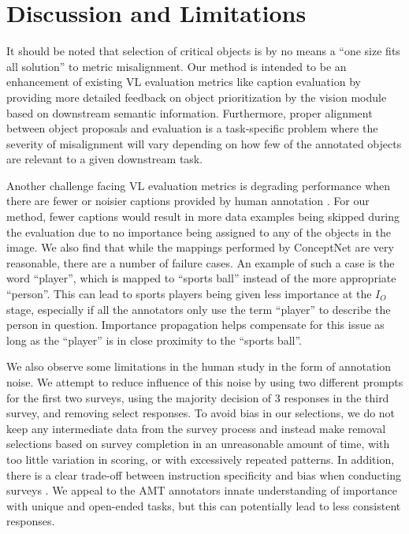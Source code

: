 \documentclass[10pt,twocolumn,letterpaper]{article}
\begin{document}
\section{Discussion and Limitations} 
It should be noted that selection of critical objects is by no means a ``one size fits all solution'' to metric misalignment. Our method is intended to be an enhancement of existing VL evaluation metrics like caption evaluation by providing more detailed feedback on object prioritization by the vision module based on downstream semantic information. Furthermore, proper alignment between object proposals and evaluation is a task-specific problem where the severity of misalignment will vary depending on how few of the annotated objects are relevant to a given downstream task. 
\par
Another challenge facing VL evaluation metrics is degrading performance when there are fewer or noisier captions provided by human annotation \cite{spice2016}. For our method, fewer captions would result in more data examples being skipped during the evaluation due to no importance being assigned to any of the objects in the image. We also find that while the mappings performed by ConceptNet are very reasonable, there are a number of failure cases. An example of such a case is the word ``player'', which is mapped to ``sports ball'' instead of the more appropriate ``person''. This can lead to sports players being given less importance at the $I_{O}$ stage, especially if all the annotators only use the term ``player'' to describe the person in question. Importance propagation helps compensate for this issue as long as the ``player'' is in close proximity to the ``sports ball''.
\par
We also observe some limitations in the human study in the form of annotation noise. We attempt to reduce influence of this noise by using two different prompts for the first two surveys, using the majority decision of 3 responses in the third survey, and removing select responses. To avoid bias in our selections, we do not keep any intermediate data from the survey process and instead make removal selections based on survey completion in an unreasonable amount of time, with too little variation in scoring, or with excessively repeated patterns. In addition, there is a clear trade-off between instruction specificity and bias when conducting surveys \cite{blame2022}. We appeal to the AMT annotators innate understanding of importance with unique and open-ended tasks, but this can potentially lead to less consistent responses. 
\end{document}
